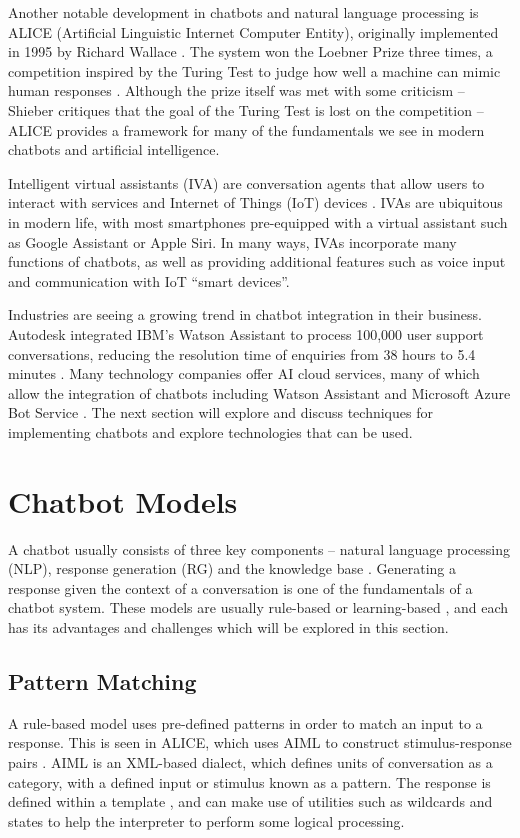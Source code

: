 Another notable development in chatbots and natural language processing is ALICE (Artificial Linguistic Internet Computer Entity), originally implemented in 1995 by Richard Wallace \cite{wallace2009anatomy}. The system won the Loebner Prize three times, a competition inspired by the Turing Test to judge how well a machine can mimic human responses \cite{keedwell2014loebner}. Although the prize itself was met with some criticism -- Shieber critiques that the goal of the Turing Test is lost on the competition \cite{shieber1994lessons} -- ALICE provides a framework for many of the fundamentals we see in modern chatbots and artificial intelligence.

Intelligent virtual assistants (IVA) are conversation agents that allow users to interact with services and Internet of Things (IoT) devices \cite{chung2018intelligent}. IVAs are ubiquitous in modern life, with most smartphones pre-equipped with a virtual assistant such as Google Assistant or Apple Siri. In many ways, IVAs incorporate many functions of chatbots, as well as providing additional features such as voice input and communication with IoT “smart devices”.

Industries are seeing a growing trend in chatbot integration in their business. Autodesk integrated IBM’s Watson Assistant \cite{ibm2017watson} to process 100,000 user support conversations, reducing the resolution time of enquiries from 38 hours to 5.4 minutes \cite{ibm2017autodesk}. Many technology companies offer AI cloud services, many of which allow the integration of chatbots including Watson Assistant and Microsoft Azure Bot Service \cite{microsoft2019azure}. The next section will explore and discuss techniques for implementing chatbots and explore technologies that can be used.

\cleardoublepage
\section{Chatbot Models}
A chatbot usually consists of three key components – natural language processing (NLP), response generation (RG) and the knowledge base \cite{cahn2017chatbot}. Generating a response given the context of a conversation is one of the fundamentals of a chatbot system. These models are usually rule-based or learning-based \cite{wang2013dataset}, and each has its advantages and challenges which will be explored in this section.

\subsection{Pattern Matching}
A rule-based model uses pre-defined patterns in order to match an input to a response. This is seen in ALICE, which uses AIML to construct stimulus-response pairs \cite{wallace2009anatomy}. AIML is an XML-based dialect, which defines units of conversation as a category, with a defined input or stimulus known as a pattern. The response is defined within a template \cite{wallace2009anatomy}, and can make use of utilities such as wildcards and states to help the interpreter to perform some logical processing.

